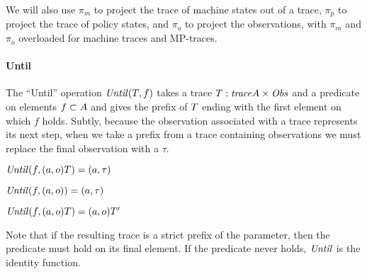\documentclass[acmsmall,review,anonymous]{acmart}\settopmatter{printfolios=true,printccs=false,printacmref=false}
\begin{document}
We will also use \(\pi_m\) to project the trace of machine states
out of a trace, \(\pi_p\) to project the trace of policy states, and
\(\pi_o\) to project the observations, with \(\pi_m\) and \(\pi_o\) overloaded
for machine traces and MP-traces.

\paragraph*{Until}
The ``Until'' operation \(\mathit{Until}(T,f)\)
takes a trace
\(T : \mathit{trace} A \times \mathit{Obs}\) and a predicate
on elements \(f \subset A\) and gives the prefix of
\(T\) ending with the first element on which \(f\) holds.
Subtly, because the observation associated with a trace represents its
next step, when we take a prefix from a trace containing observations
we must replace the final observation with a \(\tau\).

  \begin{center}
  \begin{minipage}{.3\textwidth}
             {\(\mathit{Until}(f,(a,o)T) = (a,\tau)\)}
  \end{minipage}
%
  \begin{minipage}{.3\textwidth}
  \judgment{}
           {\(\mathit{Until}(f,(a,o)) = (a,\tau)\)}
%
  \end{minipage}
  \begin{minipage}{.3\textwidth}
              {\(\mathit{Until}(f,(a,o)T) = (a,o)T'\)}
  \end{minipage}
  \end{center}
%
Note that if the resulting trace is a strict prefix of the parameter, then the
predicate must hold on its final element. If the predicate never holds,
\(\mathit{Until}\) is the identity function.


\end{document}
